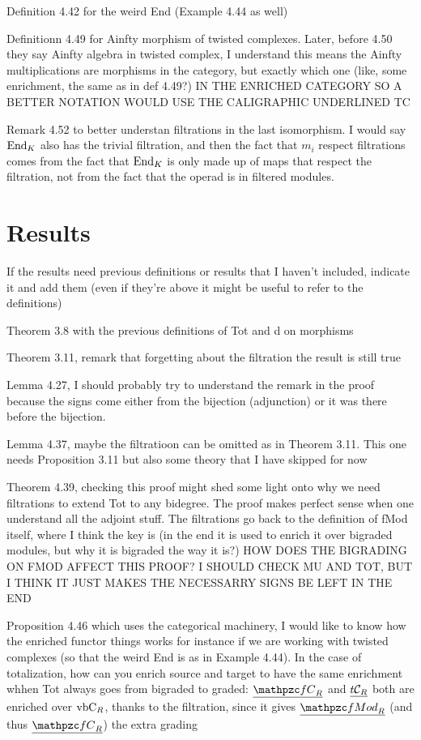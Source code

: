 \documentclass[twoside]{article}
\begin{document}
Definition 4.42 for the weird End (Example 4.44 as well)

Definitionn 4.49 for Ainfty morphism of twisted complexes. Later, before 4.50 they say Ainfty algebra in twisted complex, I understand this means the Ainfty multiplications are morphisms in the category, but exactly which one (like, some enrichment, the same as in def 4.49?) IN THE ENRICHED CATEGORY SO A BETTER NOTATION WOULD USE THE CALIGRAPHIC UNDERLINED TC

Remark 4.52 to better understan filtrations in the last isomorphism. I would say $\operatorname{End}_K$ also has the trivial filtration, and then the fact that $m_i$ respect filtrations  comes from the fact that $\operatorname{End}_K$ is only made up of maps that respect the filtration, not from the fact that the operad is in filtered modules.  

\section{Results}
If the results need previous definitions or results that I haven't included, indicate it and add them (even if they're above it might be useful to refer to the definitions)


Theorem 3.8 with the previous definitions of Tot and d on morphisms

Theorem 3.11, remark that forgetting about the filtration the result is still true

Lemma 4.27, I should probably try to understand  the remark in the proof because the signs come either from the bijection (adjunction) or it was there before the bijection.

Lemma 4.37, maybe the filtratioon can be omitted as in Theorem 3.11. This one needs Proposition 3.11 but also some theory that I have skipped for now

Theorem 4.39, checking this proof might shed some light onto why we need filtrations to extend Tot to any bidegree. The proof makes perfect sense when one understand all the adjoint stuff. The filtrations go back to the definition of fMod itself, where I think the key is (in the end it is used to enrich it over bigraded modules, but why it is bigraded the way it is?) HOW DOES THE BIGRADING ON FMOD AFFECT THIS PROOF? I SHOULD CHECK MU AND TOT, BUT I THINK IT JUST MAKES THE NECESSARRY SIGNS BE LEFT IN THE END

Proposition 4.46 which uses the categorical machinery, I would like to know how the enriched functor things works for instance if we are working with twisted complexes (so that the weird End is as in Example 4.44). In the case of totalization, how can you enrich source and target to have the same enrichment whhen Tot always goes from bigraded to graded: $\ufC$ and $\underline{t\mathcal{C}_R}$ both are enriched over $\mathrm{vbC}_R$, thanks to the filtration, since it gives $\ufMod$ (and thus $\ufC$) the extra grading
\end{document}
